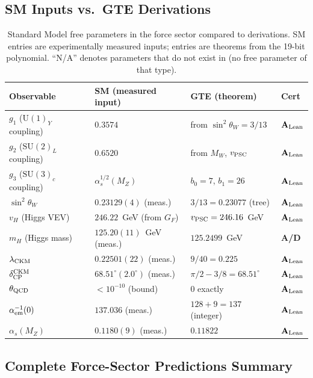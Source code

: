 \documentclass[11pt,openany]{book}
\theoremstyle{remark}
\newcommand{\GTE}{\text{GTE}}
\newcommand{\sigW}{\sin^2\!\theta_W}
\newcommand{\CatAL}{\ensuremath{\textbf{A}_{\rm Lean}}}
\newcommand{\CatAD}{\textbf{A/D}}
\begin{document}
\subsection*{SM Inputs vs.\ GTE Derivations}

\begin{table}[htbp]
\centering
\caption{Standard Model free parameters in the force sector compared to \GTE{} derivations.
SM entries are experimentally measured inputs; \GTE{} entries are theorems from the 19-bit
polynomial.  ``N/A'' denotes parameters that do not exist in \GTE{} (no free parameter of
that type).}
\label{tab:sm_vs_gte}
\renewcommand{\arraystretch}{1.25}
\begin{tabular}{P{3.5cm}P{3.2cm}P{3.2cm}P{1.5cm}}
\toprule
Observable & SM (measured input) & GTE (theorem) & Cert \\
\midrule
$g_1$ ($\mathrm{U}(1)_Y$ coupling) & $0.3574$ & from $\sigW = 3/13$ & \CatAL \\
$g_2$ ($\mathrm{SU}(2)_L$ coupling) & $0.6520$ & from $M_W$, $v_{\rm PSC}$ & \CatAL \\
$g_3$ ($\mathrm{SU}(3)_c$ coupling) & $\alpha_s^{1/2}(M_Z)$ & $b_0 = 7$, $b_1 = 26$ & \CatAL \\
$\sigW$ & $0.23129(4)$ (meas.) & $3/13 = 0.23077$ (tree) & \CatAL \\
$v_H$ (Higgs VEV) & $246.22$~GeV (from $G_F$) & $v_{\rm PSC} = 246.16$~GeV & \CatAL \\
$m_H$ (Higgs mass) & $125.20(11)$~GeV (meas.) & $125.2499$~GeV & \CatAD \\
$\lambda_{\rm CKM}$ & $0.22501(22)$ (meas.) & $9/40 = 0.225$ & \CatAL \\
$\delta_{\rm CP}^{\rm CKM}$ & $68.51^\circ(2.0^\circ)$ (meas.) & $\pi/2 - 3/8 = 68.51^\circ$ & \CatAL \\
$\theta_{\rm QCD}$ & $< 10^{-10}$ (bound) & $0$ exactly & \CatAL \\
$\alpha_{\rm em}^{-1}(0)$ & $137.036$ (meas.) & $128 + 9 = 137$ (integer) & \CatAL \\
$\alpha_s(M_Z)$ & $0.1180(9)$ (meas.) & $0.11822$ & \CatAL \\
\bottomrule
\end{tabular}
\end{table}

\subsection*{Complete Force-Sector Predictions Summary}
\end{document}
